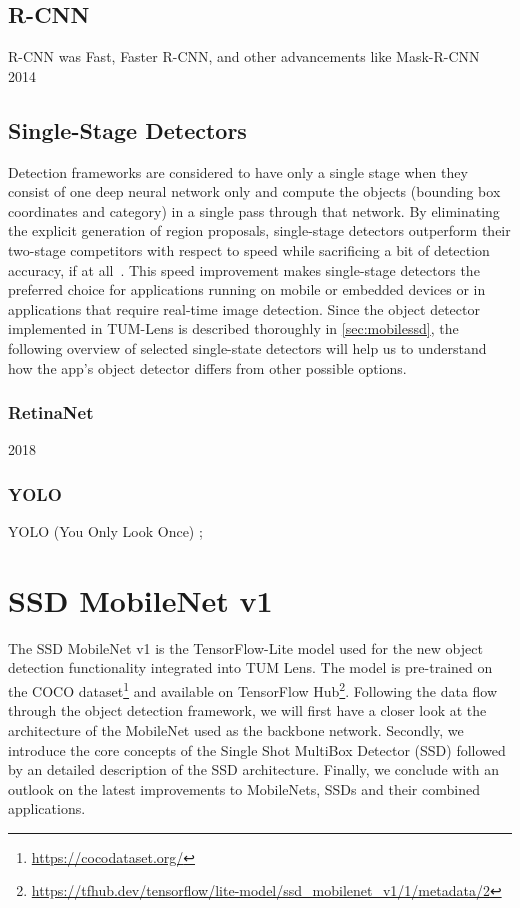 \documentclass[
			   fontsize=11pt,
               paper=a4,
               bibliography=totoc,
               idxtotoc,
               headsepline,
               footsepline,
               footinclude=false,
               BCOR=12mm,
               DIV=13,
               openany,   %
               ]
               {scrbook}
\begin{document}
\subsection{R-CNN}

R-CNN was 
Fast, Faster R-CNN, and other advancements like Mask-R-CNN
2014 \cite{detectorRCNN}

\subsection{Single-Stage Detectors}

Detection frameworks are considered to have only a single stage when they consist of one deep neural network only and compute the objects (bounding box coordinates and category) in a single pass through that network. By eliminating the explicit generation of region proposals, single-stage detectors outperform their two-stage competitors with respect to speed while sacrificing a bit of detection accuracy, if at all~\cite{detectorSSD}. %
This speed improvement makes single-stage detectors the preferred choice for applications running on mobile or embedded devices or in applications that require real-time image detection. Since the object detector implemented in TUM-Lens is described thoroughly in \autoref{sec:mobilessd}, the following overview of selected single-state detectors will help us to understand how the app's object detector differs from other possible options.

\subsubsection{RetinaNet}

2018

\subsubsection{YOLO}

YOLO (You Only Look Once) ; \cite{detectorYOLOv4}



\section{SSD MobileNet v1} \label{sec:mobilessd}

The SSD MobileNet v1 is the TensorFlow-Lite model used for the new object detection functionality integrated into TUM Lens. The model is pre-trained on the COCO dataset\footnote{\url{https://cocodataset.org/}} and available on TensorFlow Hub\footnote{\url{https://tfhub.dev/tensorflow/lite-model/ssd_mobilenet_v1/1/metadata/2}}. Following the data flow through the object detection framework, we will first have a closer look at the architecture of the MobileNet used as the backbone network. Secondly, we introduce the core concepts of the Single Shot MultiBox Detector (SSD) followed by an detailed description of the SSD architecture. Finally, we conclude with an outlook on the latest improvements to MobileNets, SSDs and their combined applications.
\end{document}
